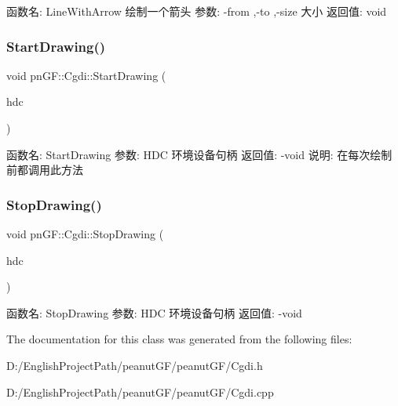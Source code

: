  函数名\+: Line\+With\+Arrow 绘制一个箭头 参数\+: -\/from ,-\/to ,-\/size 大小 返回值\+: void \mbox{\label{classpn_g_f_1_1_cgdi_ade48d557df09c099c8d84e506d6e5898}} 
\subsubsection{Start\+Drawing()}
{\footnotesize\ttfamily void pn\+G\+F\+::\+Cgdi\+::\+Start\+Drawing (\begin{DoxyParamCaption}\item[{H\+DC}]{hdc }\end{DoxyParamCaption})\hspace{0.3cm}{\ttfamily [inline]}}



 函数名\+: Start\+Drawing 参数\+: H\+DC 环境设备句柄 返回值\+: -\/void 说明\+: 在每次绘制前都调用此方法 \mbox{\label{classpn_g_f_1_1_cgdi_a659dab33daaac86f9d5c5ae453b6527c}} 
\subsubsection{Stop\+Drawing()}
{\footnotesize\ttfamily void pn\+G\+F\+::\+Cgdi\+::\+Stop\+Drawing (\begin{DoxyParamCaption}\item[{H\+DC}]{hdc }\end{DoxyParamCaption})\hspace{0.3cm}{\ttfamily [inline]}}



 函数名\+: Stop\+Drawing 参数\+: H\+DC 环境设备句柄 返回值\+: -\/void 

The documentation for this class was generated from the following files\+:\begin{DoxyCompactItemize}
\item 
D\+:/\+English\+Project\+Path/peanut\+G\+F/peanut\+G\+F/Cgdi.\+h\item 
D\+:/\+English\+Project\+Path/peanut\+G\+F/peanut\+G\+F/Cgdi.\+cpp\end{DoxyCompactItemize}
